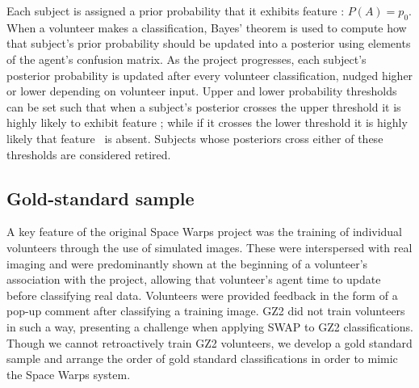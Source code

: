 Each subject is assigned a prior probability that it exhibits feature \A: $P(A) = p_0$. When a volunteer makes a classification, Bayes' theorem is used to compute how that subject's prior probability should be updated into a posterior using elements of the agent's confusion matrix. As the project progresses, each subject's posterior probability is updated after every volunteer classification, nudged higher or lower depending on volunteer input. Upper and lower probability thresholds can be set such that when a subject's posterior crosses the upper threshold it is highly likely to exhibit feature \A; while if it crosses the lower threshold it is highly likely that feature \A~is absent. Subjects whose posteriors cross either of these thresholds are considered retired.


\subsection{Gold-standard sample}\label{sec: training sample}

A key feature of the original Space Warps project was the training of individual volunteers through the use of simulated images. These were interspersed with real imaging and were predominantly shown at the beginning of a volunteer's association with the project, allowing that volunteer's agent time to update before classifying real data. Volunteers were provided feedback in the form of a pop-up comment after classifying a training image. GZ2 did not train volunteers in such a way, presenting a challenge when applying SWAP to GZ2 classifications. Though we cannot retroactively train GZ2 volunteers, we develop a gold standard sample and arrange the order of gold standard classifications in order to mimic the Space Warps system.


